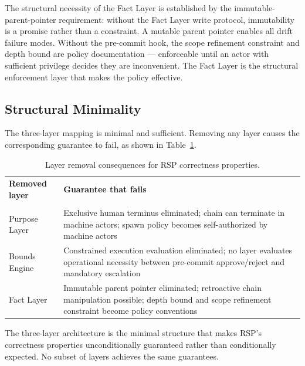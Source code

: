 The structural necessity of the Fact Layer is established by the immutable-parent-pointer requirement: without the Fact Layer write protocol, immutability is a promise rather than a constraint. A mutable parent pointer enables all drift failure modes. Without the pre-commit hook, the scope refinement constraint and depth bound are policy documentation — enforceable until an actor with sufficient privilege decides they are inconvenient. The Fact Layer is the structural enforcement layer that makes the policy effective.

\subsection{Structural Minimality}
\label{sec:rs-minimality}

The three-layer mapping is minimal and sufficient. Removing any layer causes the corresponding guarantee to fail, as shown in Table~\ref{tab:layer-minimality-rs}.

\begin{table}[h]
\centering
\begin{tabular}{p{3.2cm} p{4.8cm}}
\toprule
\textbf{Removed layer} & \textbf{Guarantee that fails} \\\\
\midrule
Purpose Layer & Exclusive human terminus eliminated; chain can terminate in machine actors; spawn policy becomes self-authorized by machine actors \\
Bounds Engine & Constrained execution evaluation eliminated; no layer evaluates operational necessity between pre-commit approve/reject and mandatory escalation \\
Fact Layer & Immutable parent pointer eliminated; retroactive chain manipulation possible; depth bound and scope refinement constraint become policy conventions \\
\bottomrule
\end{tabular}
\caption{Layer removal consequences for RSP correctness properties.}
\label{tab:layer-minimality-rs}
\end{table}

The three-layer architecture is the minimal structure that makes RSP's correctness properties unconditionally guaranteed rather than conditionally expected. No subset of layers achieves the same guarantees.
